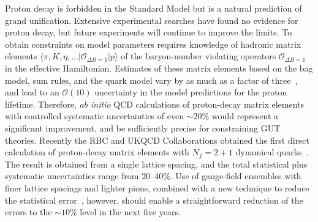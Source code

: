 \begin{itemize}
Proton decay is forbidden in the Standard Model but is a natural prediction of
grand unification.  Extensive experimental searches have found no evidence for
proton decay, but future experiments will continue to improve the limits.  To
obtain constraints on model parameters requires knowledge of hadronic matrix
elements $\langle\pi,K,\eta,\ldots|\mathcal{O}_{\Delta B=1} | p \rangle$ of
the baryon-number violating operators $\mathcal{O}_{\Delta B=1}$ in the
effective Hamiltonian.  Estimates of these matrix elements based on the bag
model, sum rules, and the quark model vary by as much as a factor of
three~\cite{Ioffe:1981kw,Claudson:1981gh,Donoghue:1982jm,Martin:2011nd}, and
lead to an ${\mathcal O}(10)$ uncertainty in the model predictions for the
proton lifetime. Therefore, \emph{ab initio} QCD calculations of proton-decay
matrix elements with controlled systematic uncertainties of even $\sim 20\%$
would represent a significant improvement, and be sufficiently precise for
constraining GUT theories. Recently the RBC and UKQCD Collaborations obtained
the first direct calculation of proton-decay matrix elements with $N_f=2+1$
dynamical quarks~\cite{Aoki:2013yxa}.  The result is obtained from a single
lattice spacing, and the total statistical plus systematic uncertainties range
from 20--40\%.  Use of gauge-field ensembles with finer lattice spacings and
lighter pions, combined with a new technique to reduce the statistical
error~\cite{Blum:2012uh}, however, should enable a straightforward reduction
of the errors to the $\sim 10\%$ level in the next five years.


\end{itemize}

